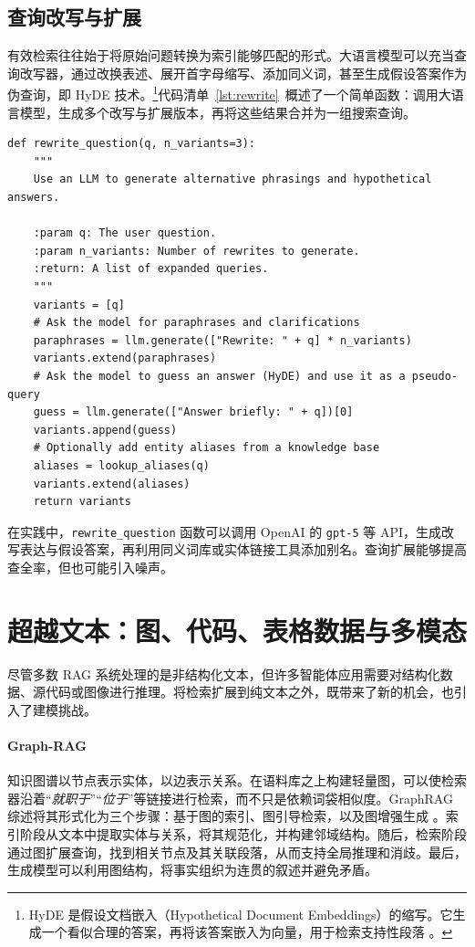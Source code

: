 \subsection{查询改写与扩展}

有效检索往往始于将原始问题转换为索引能够匹配的形式。大语言模型可以充当查询改写器，通过改换表述、展开首字母缩写、添加同义词，甚至生成假设答案作为伪查询，即 HyDE 技术。\footnote{HyDE 是假设文档嵌入（Hypothetical Document Embeddings）的缩写。它生成一个看似合理的答案，再将该答案嵌入为向量，用于检索支持性段落 \citep{gao2023hyde}。}代码清单~\ref{lst:rewrite}~概述了一个简单函数：调用大语言模型，生成多个改写与扩展版本，再将这些结果合并为一组搜索查询。

\begin{listing}[!ht]
\begin{verbatim}
def rewrite_question(q, n_variants=3):
    """
    Use an LLM to generate alternative phrasings and hypothetical answers.

    :param q: The user question.
    :param n_variants: Number of rewrites to generate.
    :return: A list of expanded queries.
    """
    variants = [q]
    # Ask the model for paraphrases and clarifications
    paraphrases = llm.generate(["Rewrite: " + q] * n_variants)
    variants.extend(paraphrases)
    # Ask the model to guess an answer (HyDE) and use it as a pseudo-query
    guess = llm.generate(["Answer briefly: " + q])[0]
    variants.append(guess)
    # Optionally add entity aliases from a knowledge base
    aliases = lookup_aliases(q)
    variants.extend(aliases)
    return variants
\end{verbatim}
\caption{一个简单的查询改写示例}
\label{lst:rewrite}
\end{listing}


在实践中，\texttt{rewrite\_question} 函数可以调用 OpenAI 的 \texttt{gpt-5} 等 API，生成改写表达与假设答案，再利用同义词库或实体链接工具添加别名。查询扩展能够提高查全率，但也可能引入噪声。




\section[图、代码与表格数据]{超越文本：图、代码、表格数据与多模态}
尽管多数 RAG 系统处理的是非结构化文本，但许多智能体应用需要对结构化数据、源代码或图像进行推理。将检索扩展到纯文本之外，既带来了新的机会，也引入了建模挑战。

\paragraph{Graph-RAG} 知识图谱以节点表示实体，以边表示关系。在语料库之上构建轻量图，可以使检索器沿着“{\em 就职于}”“{\em 位于}”等链接进行检索，而不只是依赖词袋相似度。GraphRAG 综述将其形式化为三个步骤：基于图的索引、图引导检索，以及图增强生成 \citep{peng2024graphrag_survey}。索引阶段从文本中提取实体与关系，将其规范化，并构建邻域结构。随后，检索阶段通过图扩展查询，找到相关节点及其关联段落，从而支持全局推理和消歧。最后，生成模型可以利用图结构，将事实组织为连贯的叙述并避免矛盾。



